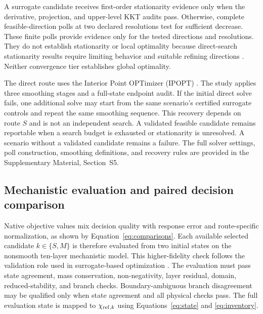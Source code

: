\documentclass[a4paper,fleqn]{cas-sc}
\begin{document}
A surrogate candidate receives first-order stationarity evidence only when the derivative, projection, and upper-level KKT audits pass. Otherwise, complete feasible-direction polls at two declared resolutions test for sufficient decrease. These finite polls provide evidence only for the tested directions and resolutions. They do not establish stationarity or local optimality because direct-search stationarity results require limiting behavior and suitable refining directions \citep{AudetDennis2006}. Neither convergence tier establishes global optimality.

The direct route uses the Interior Point OPTimizer (IPOPT) \citep{WachterBiegler2006}. The study applies three smoothing stages and a full-state endpoint audit. If the initial direct solve fails, one additional solve may start from the same scenario's certified surrogate controls and repeat the same smoothing sequence. This recovery depends on route $S$ and is not an independent search. A validated feasible candidate remains reportable when a search budget is exhausted or stationarity is unresolved. A scenario without a validated candidate remains a failure. The full solver settings, poll construction, smoothing definitions, and recovery rules are provided in the Supplementary Material, Section~S5.

\subsection{Mechanistic evaluation and paired decision comparison}

Native objective values mix decision quality with response error and route-specific normalization, as shown by Equation~\eqref{eq:comparisons}. Each available selected candidate $k\in\{S,M\}$ is therefore evaluated from two initial states on the nonsmooth ten-layer mechanistic model. This higher-fidelity check follows the validation role used in surrogate-based optimization \citep{Bhosekar2018}. The evaluation must pass state agreement, mass conservation, non-negativity, layer residual, domain, reduced-stability, and branch checks. Boundary-ambiguous branch disagreement may be qualified only when state agreement and all physical checks pass. The full evaluation state is mapped to $\chi_{{\rm ref},k}$ using Equations~\eqref{eq:state} and \eqref{eq:inventory}.
\end{document}
